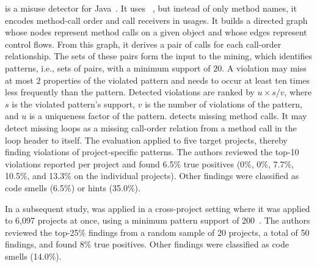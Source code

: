 \vspace{0.03in}





\Jadet is a misuse detector for Java~\cite{WZL07}.
It uses \Colibri{}~\cite{L07}, but instead of only method names, it encodes method-call order and call receivers in usages.
It builds a directed graph whose nodes represent method calls on a given object and whose edges represent control flows.
From this graph, it derives a pair of calls for each call-order relationship.
The sets of these pairs form the input to the mining, which identifies patterns, i.e., sets of pairs, with a minimum support of $20$.
A violation may miss at most $2$ properties of the violated pattern and needs to occur at least ten times less frequently than the pattern.
Detected violations are ranked by $u \times s / v$, where $s$ is the violated pattern's support, $v$ is the number of violations of the pattern, and $u$ is a uniqueness factor of the pattern.
\Jadet detects missing method calls.
It may detect missing loops as a missing call-order relation from a method call in the loop header to itself.
The evaluation applied \Jadet to five target projects, thereby finding violations of project-specific patterns.
The authors reviewed the top-10 violations reported per project and found 6.5\% true positives (0\%, 0\%, 7.7\%, 10.5\%, and 13.3\% on the individual projects).
Other findings were classified as code smells (6.5\%) or hints (35.0\%).

In a subsequent study, \Jadet was applied in a cross-project setting where it was applied to 6,097 projects at once, using a minimum pattern support of 200~\cite{GWZ10}.
The authors reviewed the top-25\% findings from a random sample of 20 projects, a total of 50 findings, and found 8\% true positives.
Other findings were classified as code smells (14.0\%).

\vspace{0.03in}


